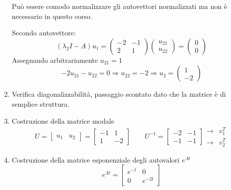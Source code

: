 \begin{enumerate}
Può essere comodo normalizzare gli autovettori normalizzati ma non è necessario
in questo corso.

Secondo autovettore:
$$
(\lambda_2 I -A)u_1 = \begin{pmatrix}
                        -2 & -1 \\
                        2 & 1
                        \end{pmatrix} \begin{pmatrix}
                                      u_{21} \\ u_{22}
                                      \end{pmatrix} = \begin{pmatrix}
                                      0 \\ 0
                                      \end{pmatrix}
$$
Assegnando arbitrariamente $u_{21} = 1$
$$
-2u_{21} - u_{22} = 0 \Rightarrow  u_{22} = -2 \Rightarrow u_2 = \begin{pmatrix}
1 \\ -2
\end{pmatrix}
$$

\item Verifica diagonalizzabilità, passaggio scontato dato che la matrice è di
semplice struttura.

\item Costruzione della matrice modale
$$
U = \begin{bmatrix}u_1 & u_2\end{bmatrix} = \begin{bmatrix}
                                            -1 & 1 \\
                                            1 & -2
                                            \end{bmatrix} \qquad U^{-1} =
\begin{bmatrix}
-2 & -1 \\
-1 & -1
\end{bmatrix}\begin{matrix}
\rightarrow & v_1^T \\ \rightarrow & v_2^T
\end{matrix}
$$

\item Costruzione della matrice esponenziale degli autovalori $e^{\Lambda t}$
$$
e^{\Lambda t} = \begin{bmatrix}
                e^{-t} & 0 \\
                0 & e^{-2 t}
                \end{bmatrix}
$$


\end{enumerate}
